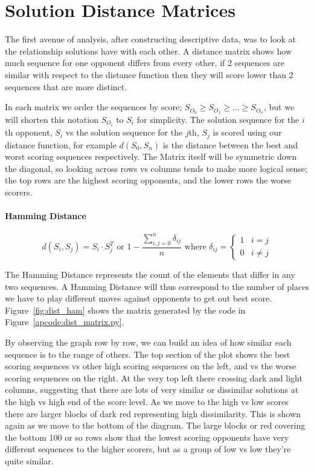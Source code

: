 \section{Solution Distance Matrices}
The first avenue of analysis, after constructing descriptive data, was to look at the relationship solutions have with each other.
A distance matrix shows how much  sequence for one opponent differs from every other, if 2 sequences are similar with respect to the distance function then they will score lower than 2 sequences that are more distinct.

In each matrix we order the sequences by score; $S_{O_0}\ge S_{O_1} \ge \ldots \ge S_{O_n}$, but we will shorten this notation $S_{O_i}$ to $S_{i}$ for simplicity.
The solution sequence for the $i$th opponent, $S_i$ vs the solution sequence for the $j$th, $S_j$ is scored using our distance function, for example $d(S_0,S_n)$ is the distance between the best and worst scoring sequences respectively.
The Matrix itself will be symmetric down the diagonal, so looking across rows vs columns tends to make more logical sense; the top rows are the highest scoring opponents, and the lower rows the worse scorers.

\paragraph{Hamming Distance}
$$d(S_i,S_j) = S_i \cdot S_j^T \text{ or } 1-\frac{\sum^n_{i,j=0}\delta_{ij}}{n}\text{ where } \delta_{ij} = \begin{cases} 
    1 & i=j \\
    0 & i\ne j 
\end{cases} $$

The Hamming Distance represents the count of the elements that differ in any two sequences. 
A Hamming Distance will thus correspond to the number of places we have to play different moves against opponents to get out best score. 
Figure~\ref{fig:dist_ham} shows the matrix generated by the code in Figure~\ref{apcode:dist_matrix.py}.

By observing the graph row by row, we can build an idea of how similar each sequence is to the range of others.
The top section of the plot shows the best scoring sequences vs other high scoring sequences on the left, and vs the worse scoring sequences on the right. 
At the very top left there crossing dark and light columns, suggesting that there are lots of very similar or dissimilar solutions at the high vs high end of the score level.
As we move to  the high vs low scores there are larger blocks of dark red representing high dissimilarity.
This is shown again as we move to the bottom of the diagram.
The large blocks or red covering the bottom 100 or so rows show that the lowest scoring opponents have very different sequences to the higher scorers, but as a group of low vs low they're quite similar.

